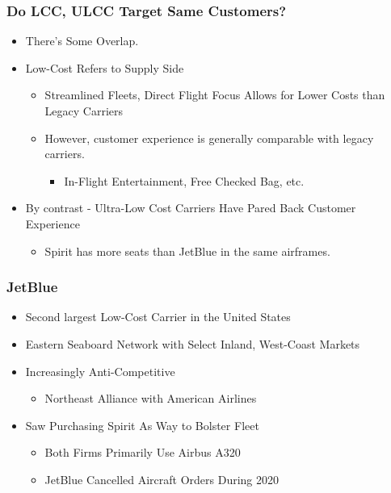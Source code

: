 \documentclass[xcolor=dvipsnames]{beamer}
\begin{document}
    \begin{frame}
        \frametitle{Do LCC, ULCC Target Same Customers?}
        \begin{itemize}
            \item There's Some Overlap. 
            \item Low-Cost Refers to Supply Side             \begin{itemize}
                \item Streamlined Fleets, Direct Flight Focus Allows for Lower Costs than Legacy Carriers
                \item However, customer experience is generally comparable with legacy carriers. 
                \begin{itemize}
                    \item In-Flight Entertainment, Free Checked Bag, etc.
                \end{itemize}
            \end{itemize}
            \item By contrast - Ultra-Low Cost Carriers Have Pared Back Customer Experience
            \begin{itemize}
                \item Spirit has more seats than JetBlue in the same airframes. 
            \end{itemize}
        \end{itemize}
    \end{frame}
	
    \begin{frame}
        \frametitle{JetBlue}
        \begin{itemize}
            \item Second largest Low-Cost Carrier in the United States
            \item Eastern Seaboard Network with Select Inland, West-Coast Markets
            \item Increasingly Anti-Competitive
            \begin{itemize}
                \item Northeast Alliance with American Airlines
            \end{itemize}
            \item Saw Purchasing Spirit As Way to Bolster Fleet
            \begin{itemize}
                \item Both Firms Primarily Use Airbus A320
                \item JetBlue Cancelled Aircraft Orders During 2020
            \end{itemize}
        \end{itemize}
    \end{frame}
\end{document}
